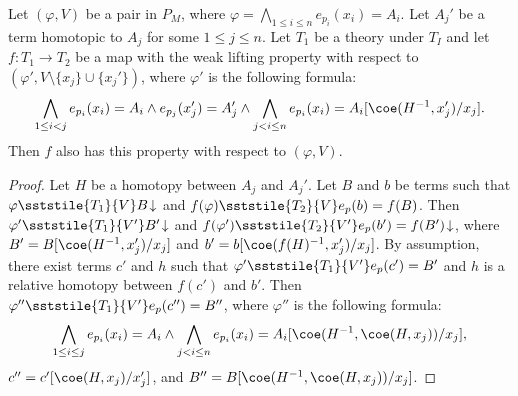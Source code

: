 \begin{lem}
Let $(\varphi, V)$ be a pair in $P_M$, where $\varphi = \bigwedge_{1 \leq i \leq n} e_{p_i}(x_i) = A_i$.
Let $A_j'$ be a term homotopic to $A_j$ for some $1 \leq j \leq n$.
Let $T_1$ be a theory under $T_I$ and let $f : T_1 \to T_2$ be a map with the weak lifting property with respect to $(\varphi', V \setminus \{ x_j \} \cup \{ x_j' \})$, where $\varphi'$ is the following formula:
\[ \bigwedge_{1 \leq i < j} e_{p_i}(x_i) = A_i \land e_{p_j}(x_j') = A_j' \land \bigwedge_{j < i \leq n} e_{p_i}(x_i) = A_i[\coe(H^{-1},x_j')/x_j]. \]
Then $f$ also has this property with respect to $(\varphi,V)$.
\end{lem}
\begin{proof}
Let $H$ be a homotopy between $A_j$ and $A_j'$.
Let $B$ and $b$ be terms such that $\varphi \sststile{T_1}{V} B\!\downarrow$ and $f(\varphi) \sststile{T_2}{V} e_p(b) = f(B)$.
Then $\varphi' \sststile{T_1}{V'} B'\!\downarrow$ and $f(\varphi') \sststile{T_2}{V'} e_p(b') = f(B')\!\downarrow$, where $B' = B[\coe(H^{-1},x_j')/x_j]$ and $b' = b[\coe(f(H)^{-1},x_j')/x_j]$.
By assumption, there exist terms $c'$ and $h$ such that $\varphi' \sststile{T_1}{V'} e_p(c') = B'$ and $h$ is a relative homotopy between $f(c')$ and $b'$.
Then $\varphi'' \sststile{T_1}{V'} e_p(c'') = B''$, where $\varphi''$ is the following formula:
\[ \bigwedge_{1 \leq i \leq j} e_{p_i}(x_i) = A_i \land \bigwedge_{j < i \leq n} e_{p_i}(x_i) = A_i[\coe(H^{-1},\coe(H,x_j))/x_j], \]
$c'' = c'[\coe(H,x_j)/x_j']$, and $B'' = B[\coe(H^{-1},\coe(H,x_j))/x_j]$.
\end{proof}

